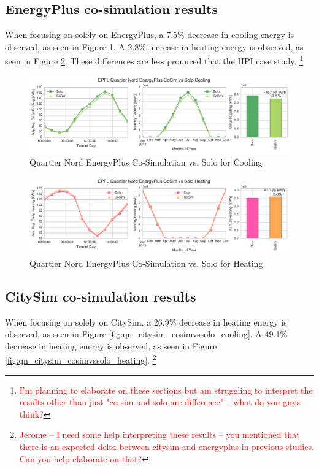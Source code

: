 \documentclass{tBPS2e}
\theoremstyle{plain}
\theoremstyle{definition}
\theoremstyle{remark}
\newcommand{\noteCM}[1]{\footnote{\textcolor{red}{#1}}}
\begin{document}
\subsection{EnergyPlus co-simulation results}

When focusing on solely on EnergyPlus, a 7.5\% decrease in cooling energy is observed, as seen in Figure \ref{fig:qn_eplus_cosimvssolo_cooling}. A 2.8\% increase in heating energy is observed, as seen in Figure \ref{fig:qn_eplus_cosimvssolo_heating}. These differences are less prounced that the HPI case study. \noteCM{I'm planning to elaborate on these sections but am struggling to interpret the results other than just "co-sim and solo are difference" -- what do you guys think?}


\begin{figure}[H]
\centering
\includegraphics[scale=0.55]{figures/QN_EnergyPlus_Cooling}
\caption{Quartier Nord EnergyPlus Co-Simulation vs. Solo for Cooling}
\label{fig:qn_eplus_cosimvssolo_cooling}
\end{figure}


\begin{figure}[H]
\centering
\includegraphics[scale=0.55]{figures/QN_EnergyPlus_Heating}
\caption{Quartier Nord EnergyPlus Co-Simulation vs. Solo for Heating}
\label{fig:qn_eplus_cosimvssolo_heating}
\end{figure}

\subsection{CitySim co-simulation results}

When focusing on solely on CitySim, a 26.9\% decrease in heating energy is observed, as seen in Figure \ref{fig:qn_citysim_cosimvssolo_cooling}. A 49.1\% decrease in heating energy is observed, as seen in Figure \ref{fig:qn_citysim_cosimvssolo_heating}. \noteCM{Jerome -- I need some help interpreting these results -- you mentioned that there is an expected delta between citysim and energyplus in previous studies. Can you help elaborate on that?}
\end{document}
